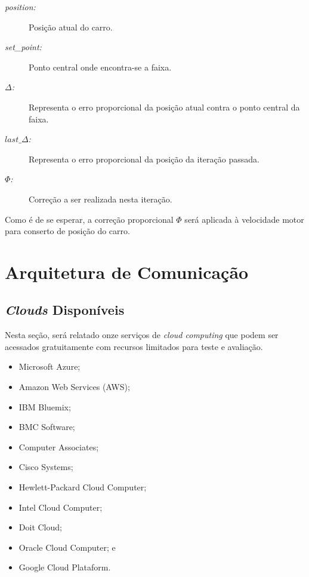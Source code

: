 \documentclass[portugues, brazil, a4paper,12pt]{article}
\begin{document}
		\begin{description}
			\item[\textit{position:}] Posição atual do carro.

			\item[\textit{set\_point:}] Ponto central onde encontra-se a faixa.

			\item[$ \Delta $\textit{:}] Representa o erro proporcional da posição atual contra o ponto central da faixa.


			\item[$ last\_\Delta $\textit{:}] Representa o erro proporcional da posição da iteração passada.


			\item[$ \Phi $\textit{:}] Correção a ser realizada nesta iteração.
		\end{description}

		Como é de se esperar, a correção proporcional $ \Phi $ será aplicada à velocidade motor para conserto de posição do carro.


\section{Arquitetura de Comunicação} \label{sec:arch}

	\subsection{\textit{Clouds} Disponíveis}
		Nesta seção, será relatado onze serviços de \textit{cloud computing} que podem ser acessados gratuitamente com recursos limitados para teste e avaliação.

		\begin{itemize}
			\item Microsoft Azure; %
			\item Amazon Web Services (AWS);
			\item IBM Bluemix;
			\item BMC Software;
			\item Computer Associates;
			\item Cisco Systems;
			\item Hewlett-Packard Cloud Computer;
			\item Intel Cloud Computer;
			\item Doit Cloud;
			\item Oracle Cloud Computer; e
			\item Google Cloud Plataform.
		\end{itemize}
\end{document}
